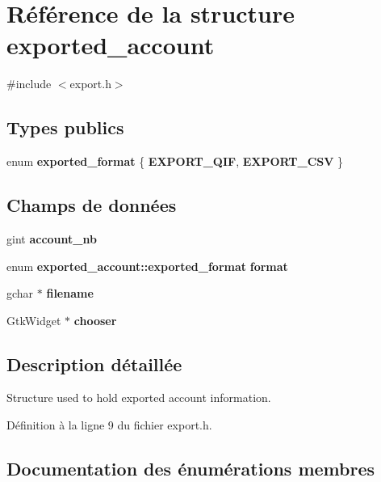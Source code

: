 \section{Référence de la structure exported\_\-account}
\label{structexported__account}


{\ttfamily \#include $<$export.h$>$}

\subsection*{Types publics}
\begin{DoxyCompactItemize}
\item 
enum {\bf exported\_\-format} \{ {\bf EXPORT\_\-QIF}, 
{\bf EXPORT\_\-CSV}
 \}
\end{DoxyCompactItemize}
\subsection*{Champs de données}
\begin{DoxyCompactItemize}
\item 
gint {\bf account\_\-nb}
\item 
enum {\bf exported\_\-account::exported\_\-format} {\bf format}
\item 
gchar $\ast$ {\bf filename}
\item 
GtkWidget $\ast$ {\bf chooser}
\end{DoxyCompactItemize}


\subsection{Description détaillée}
Structure used to hold exported account information. 

Définition à la ligne 9 du fichier export.h.



\subsection{Documentation des énumérations membres}
